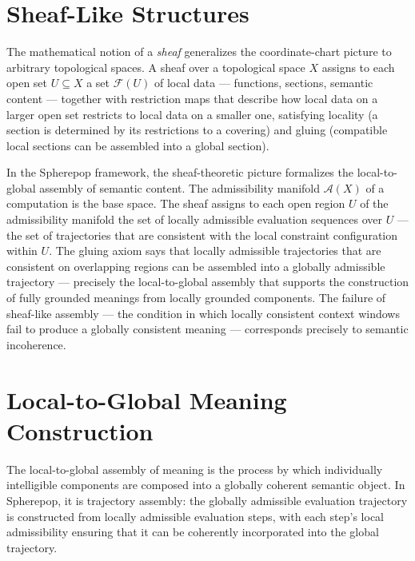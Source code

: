 \documentclass[12pt,openany]{book}
\theoremstyle{plain}
\theoremstyle{definition}
\theoremstyle{remark}
\begin{document}
\section{Sheaf-Like Structures}

The mathematical notion of a \emph{sheaf} generalizes the coordinate-chart picture to arbitrary topological spaces. A sheaf over a topological space $X$ assigns to each open set $U \subseteq X$ a set $\mathcal{F}(U)$ of local data — functions, sections, semantic content — together with restriction maps that describe how local data on a larger open set restricts to local data on a smaller one, satisfying locality (a section is determined by its restrictions to a covering) and gluing (compatible local sections can be assembled into a global section).

In the Spherepop framework, the sheaf-theoretic picture formalizes the local-to-global assembly of semantic content. The admissibility manifold $\mathcal{A}(X)$ of a computation is the base space. The sheaf assigns to each open region $U$ of the admissibility manifold the set of locally admissible evaluation sequences over $U$ — the set of trajectories that are consistent with the local constraint configuration within $U$. The gluing axiom says that locally admissible trajectories that are consistent on overlapping regions can be assembled into a globally admissible trajectory — precisely the local-to-global assembly that supports the construction of fully grounded meanings from locally grounded components. The failure of sheaf-like assembly — the condition in which locally consistent context windows fail to produce a globally consistent meaning — corresponds precisely to semantic incoherence.

\section{Local-to-Global Meaning Construction}

The local-to-global assembly of meaning is the process by which individually intelligible components are composed into a globally coherent semantic object. In Spherepop, it is trajectory assembly: the globally admissible evaluation trajectory is constructed from locally admissible evaluation steps, with each step's local admissibility ensuring that it can be coherently incorporated into the global trajectory.
\end{document}
